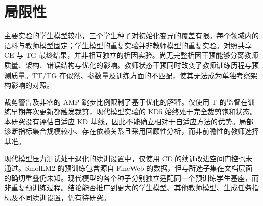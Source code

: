 \section*{局限性}\label{sec:limitations}

主要实验的学生模型较小，三个学生种子对初始化变异的覆盖有限。每个领域内的语料与教师模型固定；学生模型的重复实验并非教师模型的重复实验。对照共享 CE 与 TG 最终结果，并非相互独立的析因实验。尚无完整析因干预能够分离教师质量、架构、错误结构与优化的影响。教师状态干预同时改变了教师训练历程与预测质量。TT/TG 在似然、参数量及训练方面的不匹配，使其无法成为单独考察架构影响的对照。

裁剪警告及非零的 AMP 跳步比例限制了基于优化的解释。仅使用 T 的监督在训练早期每次更新都触发裁剪，现代模型实验的 KD5 始终处于完全裁剪饱和状态。本研究没有评估自适应 KD 基线，因此不能确立相对于自适应方法的优势。局部诊断指标集合规模较小、存在依赖关系且采用回顾性分析，而非前瞻性的教师选择基准。

现代模型压力测试处于退化的续训设置中，仅使用 CE 的续训改进空间门控也未通过。SmolLM2 的预训练包含源自 FineWeb 的数据，但与所选子集在文档层面的确切重叠仍未知。现代模型的各个种子分别独立适配同一个预训练学生基座，而非重复预训练过程。结论能否推广到更大的学生模型、其他教师模型、生成任务指标及不同续训设置，仍有待研究。
